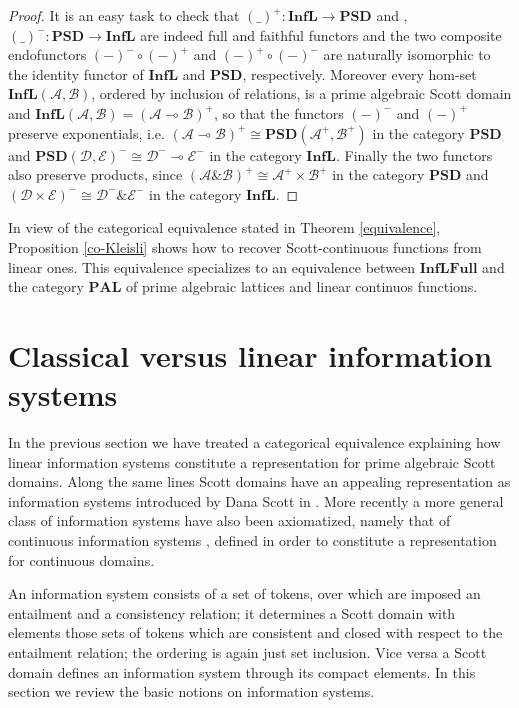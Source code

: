 \documentclass[copyright,creativecommons]{eptcs}
\newcommand{\D}{{\mathcal D}}
\newcommand{\E}{{\mathcal E}}
\newcommand{\cA}{\mathcal{A}}
\newcommand{\cB}{\mathcal{B}}
\newcommand{\Psd}{\mathbf{PSD}} \newcommand{\Sd}{\mathbf{SD}} \newcommand{\Palglat}{\mathbf{PAL}} \newcommand{\Cpo}{\mathbf{Cpo}} \newcommand{\Inf}{\mathbf{Inf}} \newcommand{\Inflfull}{\mathbf{InfLFull}} \newcommand{\Scottl}{\mathbf{ScottL}} \newcommand{\Rel}{\mathbf{Rel}} \newcommand{\Infl}{\mathbf{InfL}} \newcommand{\Cl}{Cl}
\begin{document}
\begin{proof}
It is an easy task to check that $(\_ )^+: \Infl \to \Psd$ and ,$(\_ )^-: \Psd \to \Infl$ are indeed full and faithful functors and the two composite endofunctors $(-)^- \circ (-)^+$ and $(-)^+ \circ (-)^-$ are naturally isomorphic to the identity functor of $\Infl$ and $\Psd$, respectively. Moreover every hom-set $\Infl(\cA, \cB)$, ordered by inclusion of relations, is a prime algebraic Scott domain and $\Infl(\cA, \cB) = (\cA \multimap \cB)^+$, so that the functors $(-)^-$ and $(-)^+$ preserve exponentials, i.e. $(\cA \multimap \cB)^+ \cong \Psd(\cA^+, \cB^+)$ in the category $\Psd$ and $\Psd(\D, \E)^- \cong \D^- \multimap \E^-$ in the category $\Infl$. Finally the two functors also preserve products, since $(\cA \binampersand \cB)^+ \cong \cA^+ \times \cB^+$ in the category $\Psd$ and $(\D \times \E)^- \cong \D^- \binampersand \E^-$ in the category $\Infl$.
\end{proof}

In view of the categorical equivalence stated in Theorem \ref{equivalence}, Proposition \ref{co-Kleisli} shows how to recover Scott-continuous functions from linear ones. This equivalence specializes to an equivalence between $\Inflfull$ and the category $\Palglat$ of prime algebraic lattices and linear continuos functions.

\section{Classical versus linear information systems}

In the previous section we have treated a categorical equivalence explaining how linear information systems constitute a representation for prime algebraic Scott domains. Along the same lines Scott domains have an appealing representation as information systems introduced by Dana Scott in \cite{Scott82}. More recently \cite{Spreen08} a more general class of information systems have also been axiomatized, namely that of continuous information systems , defined in order to constitute a representation for continuous domains.

An information system consists of a set of tokens, over which are imposed an entailment and a consistency relation; it determines a Scott domain with elements those sets of tokens which are consistent and closed with respect to the entailment relation; the ordering is again just set inclusion. Vice versa a Scott domain defines an information system through its compact elements. In this section we review the basic notions on information systems.
\end{document}
